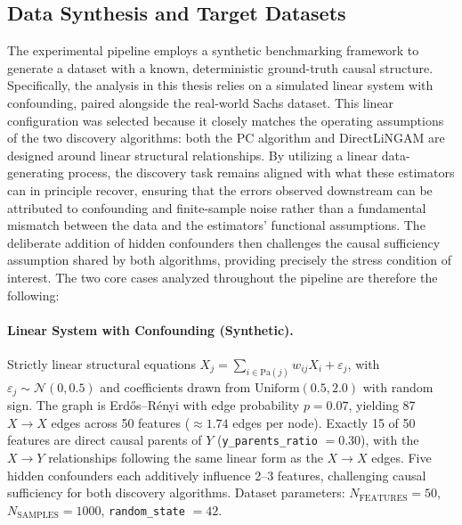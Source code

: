\documentclass[12pt,a4paper,oneside]{article}
\begin{document}
\subsection{Data Synthesis and Target Datasets}

The experimental pipeline employs a synthetic benchmarking framework to generate a dataset with a known, deterministic ground-truth causal structure. Specifically, the analysis in this thesis relies on a simulated linear system with confounding, paired alongside the real-world Sachs dataset. This linear configuration was selected because it closely matches the operating assumptions of the two discovery algorithms: both the PC algorithm and DirectLiNGAM are designed around linear structural relationships. By utilizing a linear data-generating process, the discovery task remains aligned with what these estimators can in principle recover, ensuring that the errors observed downstream can be attributed to confounding and finite-sample noise rather than a fundamental mismatch between the data and the estimators' functional assumptions. The deliberate addition of hidden confounders then challenges the causal sufficiency assumption shared by both algorithms, providing precisely the stress condition of interest. The two core cases analyzed throughout the pipeline are therefore the following:

\paragraph{Linear System with Confounding (Synthetic).}
Strictly linear structural equations $X_j = \sum_{i \in \mathrm{Pa}(j)} w_{ij} X_i + \varepsilon_j$, with $\varepsilon_j \sim \mathcal{N}(0, 0.5)$ and coefficients drawn from $\mathrm{Uniform}(0.5, 2.0)$ with random sign. The graph is Erd\H{o}s--R\'{e}nyi with edge probability $p = 0.07$, yielding 87 $X \to X$ edges across 50 features (${\approx}1.74$ edges per node). Exactly 15 of 50 features are direct causal parents of $Y$ (\texttt{y\_parents\_ratio} $= 0.30$), with the $X \to Y$ relationships following the same linear form as the $X \to X$ edges. Five hidden confounders each additively influence 2--3 features, challenging causal sufficiency for both discovery algorithms. Dataset parameters: $N_{\mathrm{FEATURES}} = 50$, $N_{\mathrm{SAMPLES}} = 1000$, \texttt{random\_state} $= 42$.
\end{document}
